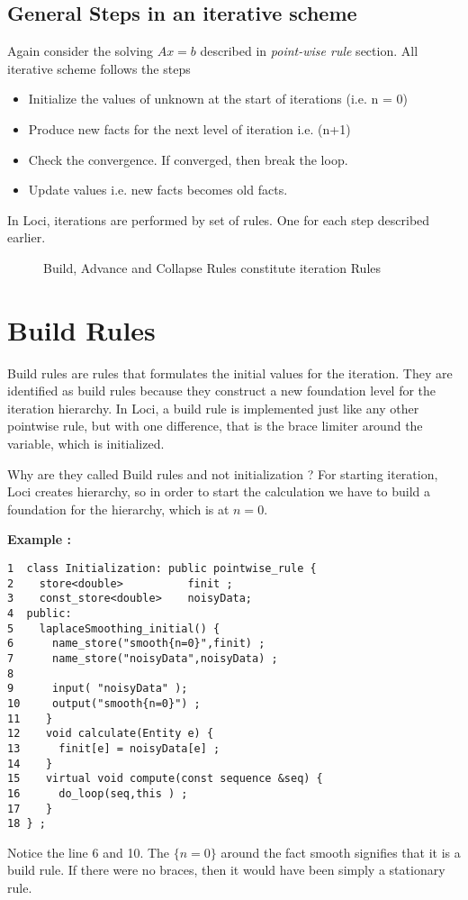 \subsection { General Steps in an iterative scheme }
Again consider the solving $Ax=b$ described in {\em point-wise rule} section.
All iterative scheme follows the steps
\begin{itemize}
\item Initialize the values of unknown at the start of iterations (i.e. n = 0)
\item Produce new facts for the next level of iteration i.e. (n+1)
\item Check the convergence. If converged, then break the loop.
\item Update values i.e. new facts becomes old facts.
\end{itemize}

\par In Loci,  iterations are performed by set of rules. One for each step 
described earlier.  
%
\begin{figure}[h]
\vspace{2.70in}\caption { Build, Advance and Collapse Rules constitute iteration Rules}
\label {FigIteration}
\end{figure}
%
\section {Build Rules}
\par Build rules are rules that formulates the initial values for the iteration.
They are identified as build rules because they construct a new foundation level for
the iteration hierarchy. In Loci, a build rule is implemented just like any other
pointwise rule, but with one difference, that is the brace limiter around the
variable, which is initialized. 

\par Why are they called Build rules and not initialization ?  For starting
iteration, Loci creates hierarchy, so in order to start the calculation we have
to build a foundation for the hierarchy, which is at $n=0$. 

\par {\bf Example :}
\begin{verbatim}
1  class Initialization: public pointwise_rule {
2    store<double>          finit ;
3    const_store<double>    noisyData;
4  public:
5    laplaceSmoothing_initial() {
6      name_store("smooth{n=0}",finit) ;
7      name_store("noisyData",noisyData) ;
8
9      input( "noisyData" );
10     output("smooth{n=0}") ;
11    }
12    void calculate(Entity e) {
13      finit[e] = noisyData[e] ;
14    }
15    virtual void compute(const sequence &seq) {
16      do_loop(seq,this ) ;
17    }
18 } ;
\end{verbatim}
\par Notice the line 6 and 10. The $\{ n= 0 \}$ around the fact smooth signifies that
it is a build rule. If there were no braces, then it would have been simply a stationary
rule.

